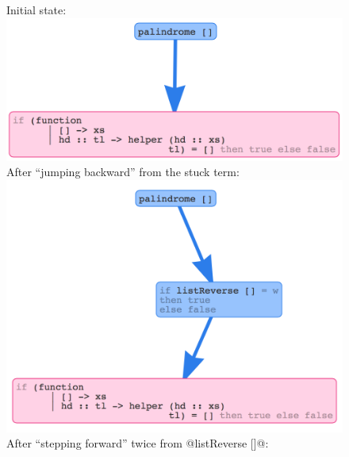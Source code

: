 \begin{figure}[t]
Initial state: \\
\includegraphics[width=\linewidth]{palindrome} \\
After ``jumping backward'' from the stuck term: \\
\includegraphics[width=\linewidth]{palindrome2} \\
After ``stepping forward'' twice from @listReverse []@: \\

\end{figure}
